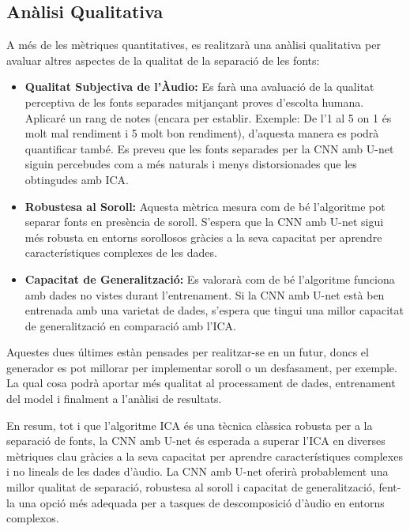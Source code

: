 \documentclass[10pt,a4paper,twocolumn,twoside]{article}
\begin{document}
\subsection{Anàlisi Qualitativa}

A més de les mètriques quantitatives, es realitzarà una anàlisi qualitativa per avaluar altres aspectes de la qualitat de la separació de les fonts:

\begin{itemize}
    \item \textbf{Qualitat Subjectiva de l'Àudio:} Es farà una avaluació de la qualitat perceptiva de les fonts separades mitjançant proves d'escolta humana. Aplicaré un rang de notes (encara per establir. Exemple: De l'1 al 5 on 1 és molt mal rendiment i 5 molt bon rendiment), d'aquesta manera es podrà quantificar també. Es preveu que les fonts separades per la CNN amb U-net siguin percebudes com a més naturals i menys distorsionades que les obtingudes amb ICA.
    
    \item \textbf{Robustesa al Soroll:} Aquesta mètrica mesura com de bé l'algoritme pot separar fonts en presència de soroll. S'espera que la CNN amb U-net sigui més robusta en entorns sorollosos gràcies a la seva capacitat per aprendre característiques complexes de les dades.
    
    \item \textbf{Capacitat de Generalització:} Es valorarà com de bé l'algoritme funciona amb dades no vistes durant l'entrenament. Si la CNN amb U-net està ben entrenada amb una varietat de dades, s'espera que tingui una millor capacitat de generalització en comparació amb l'ICA.
\end{itemize}

Aquestes dues últimes estàn pensades per realitzar-se en un futur, doncs el generador es pot millorar per implementar soroll o un desfasament, per exemple. La qual cosa podrà aportar més qualitat al processament de dades, entrenament del model i finalment a l'anàlisi de resultats.

En resum, tot i que l'algoritme ICA és una tècnica clàssica robusta per a la separació de fonts, la CNN amb U-net és esperada a superar l'ICA en diverses mètriques clau gràcies a la seva capacitat per aprendre característiques complexes i no lineals de les dades d'àudio. La CNN amb U-net oferirà probablement una millor qualitat de separació, robustesa al soroll i capacitat de generalització, fent-la una opció més adequada per a tasques de descomposició d'àudio en entorns complexos.
\end{document}

